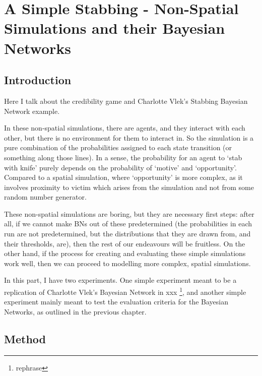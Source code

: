  

\chapter[Simple Non-Spatial Simulations]{A Simple Stabbing - Non-Spatial Simulations and their Bayesian Networks}

\section{Introduction}
Here I talk about the credibility game and Charlotte Vlek's Stabbing Bayesian Network example.

In these non-spatial simulations, there are agents, and they interact with each other, but there is no environment for them to interact in. So the simulation is a pure combination of the probabilities assigned to each state transition (or something along those lines). In a sense, the probability for an agent to `stab with knife' purely depends on the probability of `motive' and `opportunity'. Compared to a spatial simulation, where `opportunity' is more complex, as it involves proximity to victim which arises from the simulation and not from some random number generator.

These non-spatial simulations are boring, but they are necessary first steps: after all, if we cannot make BNs out of these predetermined (the probabilities in each run are not predetermined, but the distributions that they are drawn from, and their thresholds, are), then the rest of our endeavours will be fruitless. On the other hand, if the process for creating and evaluating these simple simulations work well, then we can proceed to modelling more complex, spatial simulations.

In this part, I have two experiments. One simple experiment meant to be a replication of Charlotte Vlek's Bayesian Network in xxx \footnote{rephrase}, and another simple experiment mainly meant to test the evaluation criteria for the Bayesian Networks, as outlined in the previous chapter.

\section{Method}

